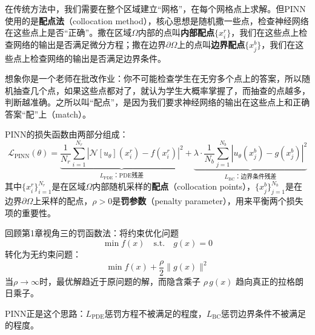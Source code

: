 \begin{keyidea}
在传统方法中，我们需要在整个区域建立“网格”，在每个网格点上求解。但PINN使用的是\textbf{配点法}（collocation method），核心思想是随机撒一些点，检查神经网络在这些点上是否“正确”。撒在区域$\Omega$内部的点叫\textbf{内部配点}$\{x_i^r\}$，我们在这些点上检查网络的输出是否满足微分方程；撒在边界$\partial\Omega$上的点叫\textbf{边界配点}$\{x_j^b\}$，我们在这些点上检查网络的输出是否满足边界条件。

想象你是一个老师在批改作业：你不可能检查学生在无穷多个点上的答案，所以随机抽查几个点，如果这些点都对了，就认为学生大概率掌握了，而抽查的点越多，判断越准确。之所以叫“配点”，是因为我们要求神经网络的输出在这些点上和正确答案“配”上（match）。
\end{keyidea}

\begin{definition}[PINN损失函数]
PINN的损失函数由两部分组成：
\begin{equation}
    \mathcal{L}_{\text{PINN}}(\theta) = \underbrace{\frac{1}{N_r}\sum_{i=1}^{N_r} \left|\mathcal{N}[u_\theta](x_i^r) - f(x_i^r)\right|^2}_{L_{\text{PDE}}\text{：PDE残差}} + \underbrace{\lambda \cdot \frac{1}{N_b}\sum_{j=1}^{N_b} \left|u_\theta(x_j^b) - g(x_j^b)\right|^2}_{L_{\text{BC}}\text{：边界条件残差}}
\end{equation}
其中$\{x_i^r\}_{i=1}^{N_r}$是在区域$\Omega$内部随机采样的\textbf{配点}（collocation points），$\{x_j^b\}_{j=1}^{N_b}$是在边界$\partial\Omega$上采样的配点，$\rho > 0$是\textbf{罚参数}（penalty parameter），用来平衡两个损失项的重要性。
\end{definition}

\begin{remark}[罚函数法的本质]
回顾第1章视角三的罚函数法：将约束优化问题
\begin{equation}
    \min f(x) \quad \text{s.t.} \quad g(x) = 0
\end{equation}
转化为无约束问题：
\begin{equation}
    \min f(x) + \frac{\rho}{2}\|g(x)\|^2
\end{equation}
当$\rho \to \infty$时，最优解趋近于原问题的解，而隐含乘子 $\rho\, g(x)$ 趋向真正的拉格朗日乘子。

PINN正是这个思路：$L_{\text{PDE}}$惩罚方程不被满足的程度，$L_{\text{BC}}$惩罚边界条件不被满足的程度。
\end{remark}

